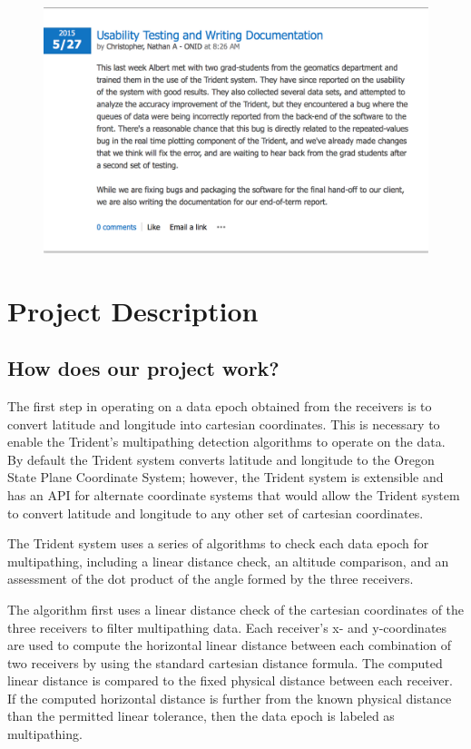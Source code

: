 \documentclass[12pt]{article}
\begin{document}
\begin{figure}[H]
\centering
\includegraphics[scale=0.5]{blog_posts/2015_5_27.png}
\label{fig:my_label}
\end{figure}

\section{Project Description}
\subsection{How does our project work?}
The first step in operating on a data epoch obtained from the receivers is to convert latitude and longitude into cartesian coordinates. This is necessary to enable the Trident’s multipathing detection algorithms to operate on the data. By default the Trident system converts latitude and longitude to the Oregon State Plane Coordinate System; however, the Trident system is extensible and has an API for alternate coordinate systems that would allow the Trident system to convert latitude and longitude to any other set of cartesian coordinates.

The Trident system uses a series of algorithms to check each data epoch for multipathing, including a linear distance check, an altitude comparison, and an assessment of the dot product of the angle formed by the three receivers.

The algorithm first uses a  linear distance check of the cartesian coordinates of the three receivers to filter multipathing data. Each receiver’s x- and y-coordinates are used to compute the horizontal linear distance between each combination of two receivers by using the standard cartesian distance formula. The computed linear distance is compared to the fixed physical distance between each receiver. If the computed horizontal distance is further from the known physical distance than the permitted linear tolerance, then the data epoch is labeled as multipathing.
\end{document}
